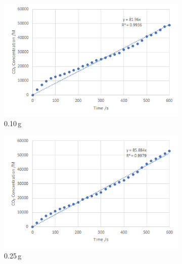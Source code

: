 \documentclass{article}
\begin{document}
\begin{figure}[H]
    \caption{Concentration-time graphs for grams of glucose added from the second trial}
    \centering
    \begin{subfigure}{0.49\linewidth}
        \includegraphics[width=\linewidth]{figures/appendix/appendix2_0.01_trial2.png}
        \vspace*{-18pt}
        \caption{0.10\,\si{g}}
    \end{subfigure}
    \begin{subfigure}{0.49\linewidth}
        \includegraphics[width=\linewidth]{figures/appendix/appendix2_0.25_trial2.png}
        \vspace*{-18pt}
        \caption{0.25\,\si{g}}
    \end{subfigure}
    \begin{subfigure}{0.49\linewidth}

\end{subfigure}
\end{figure}
\end{document}
